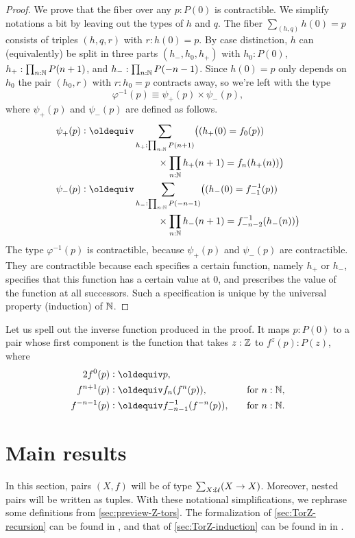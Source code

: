 \documentclass[a4paper,12pt]{amsart}
\begin{document}
\begin{proof}
  We prove that the fiber over any $p : P(0)$ is contractible.
  We simplify notations a bit by leaving out the types of $h$ and $q$.
  The fiber $\sum_{(h,q)} h(0)=p$ consists of triples $(h,q,r)$ with $r : h(0) = p$.
  By case distinction, $h$ can (equivalently) be split in three parts $(h_-,h_0,h_+)$
  with $h_0 : P(0)$, $h_+ : \prod_{n:\mathbb{N}}P(n+1)$,  and $h_- : \prod_{n:\mathbb{N}} P(-n-1)$.
  Since $h(0)=p$ only depends on $h_0$ the pair $(h_0,r)$ with  $r : h_0 = p$
  contracts away, so we're left with the type
  \[
    \varphi^{-1}(p) \equiv \psi_+(p) \times \psi_-(p),
  \]
  where $\psi_+(p)$ and $\psi_-(p)$ are defined as follows.
  \begin{align*}
    \psi_+(p) & \defeq  \sum_{h_+ : \prod_{n:\NN}P(n+1)}  \bigl((h_+(0) = f_0(p))         \\
    & \hspace {8em} \times \prod_{n:\NN}h_+(n+1) = f_n(h_+(n))\bigr) \\
    \psi_-(p) & \defeq  \sum_{h_- : \prod_{n:\NN}P(-n-1)} \bigl((h_-(0) = f_{-1}^{-1}(p))  \\
    & \hspace {8em} \times \prod_{n:\NN}h_-(n+1) = f_{-n-2}^{-1}(h_-(n))\bigr)
  \end{align*}
  The type $\varphi^{-1}(p)$ is contractible, because $\psi_+(p)$ and $\psi_-(p)$ are contractible.
  They are contractible because each specifies a certain function, namely $h_+$ or $h_-$,
  specifies that this function has a certain value at $0$,
  and prescribes the value of the function at all successors.
  Such a specification is unique by the universal property (induction) of $\mathbb{N}$.
\end{proof}

Let us spell out the inverse function produced in the proof.
It maps $p : P(0)$ to a pair whose first component
is the function that takes $z:\mathbb{Z}$ to $f^z(p):P(z)$, where
\begin{alignat*}2
  f^0(p) &\defeq p, && \\
  f^{n+1}(p) &\defeq f_n(f^n(p)),&\quad&\text{for $n:\NN$,} \\
  f^{-n-1}(p) &\defeq f_{-n-1}^{-1}(f^{-n}(p)),&\quad&\text{for $n:\NN$.}
\end{alignat*}

\section{Main results}
\label{sec:ZTorsors}

In this section, pairs $(X,f)$ will be of type $\sum_{X:\mathcal{U}}(X\to X)$.
Moreover, nested pairs will be written as tuples.
With these notational simplifications, we rephrase some definitions from
\cref{sec:preview-Z-tors}.
The formalization of \cref{sec:TorZ-recursion} can be found in \cite[\href{https://github.com/UniMath/UniMath/blob/master/UniMath/SyntheticHomotopyTheory/Circle.v}{Circle.v}]{UniMath},
and that of \cref{sec:TorZ-induction} can be found in in \cite[\href{https://github.com/UniMath/UniMath/blob/master/UniMath/SyntheticHomotopyTheory/Circle2.v}{Circle2.v}]{UniMath}.
\end{document}
